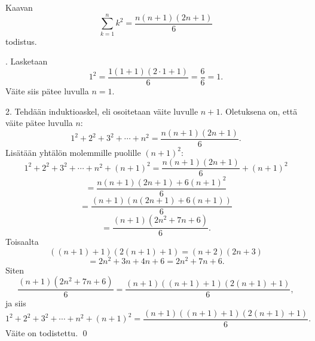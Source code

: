 Kaavan 
\[
\sum_{k=1}^n k^2= \frac{n(n+1)(2n+1)}{6}
\]
todistus.

. Lasketaan
\[
1^2 = \frac{1(1+1)(2\cdot 1 +1)}{6} = \frac{6}{6}=1.
\]
Väite siis pätee luvulla $n=1$.

2. Tehdään induktioaskel, eli osoitetaan väite luvulle $n+1$. Oletuksena on, että väite pätee luvulla $n$:
\[
1^2+2^2+3^2 + \cdots + n^2 = \frac{n(n+1)(2n+1)}{6}.
\]
Lisätään yhtälön molemmille puolille $(n+1)^2$:
\[
1^2+2^2+3^2 + \cdots + n^2+ (n+1)^2 = \frac{n(n+1)(2n+1)}{6}+(n+1)^2
\]
\[
= \frac{n(n+1)(2n+1)+6(n+1)^2}{6}
\]
\[
= 
\frac{(n+1)(n(2n+1)+6(n+1))}{6}
\]
\[
=
\frac{(n+1)(2n^2+7n+6)}{6}.
\]
Toisaalta
\[
((n+1)+1)(2(n+1)+1)=(n+2)(2n+3)
\]
\[
=2n^2+3n+4n+6=2n^2+7n+6.
\]
Siten 
\[
\frac{(n+1)(2n^2+7n+6)}{6}
= \frac{(n+1)((n+1)+1)(2(n+1)+1)}{6},
\]
ja siis
\[
1^2+2^2+3^2 + \cdots + n^2+ (n+1)^2 %
= \frac{(n+1)((n+1)+1)(2(n+1)+1)}{6}.
\]
Väite on todistettu.
\qed
